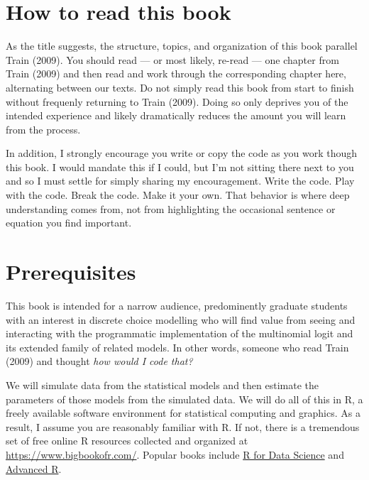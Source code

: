 \documentclass[
  letterpaper,
  DIV=11,
  numbers=noendperiod]{scrreprt}
\begin{document}
\section*{How to read this book}\label{how-to-read-this-book}


As the title suggests, the structure, topics, and organization of this
book parallel Train (2009). You should read --- or most likely, re-read
--- one chapter from Train (2009) and then read and work through the
corresponding chapter here, alternating between our texts. Do not simply
read this book from start to finish without frequenly returning to Train
(2009). Doing so only deprives you of the intended experience and likely
dramatically reduces the amount you will learn from the process.

In addition, I strongly encourage you write or copy the code as you work
though this book. I would mandate this if I could, but I'm not sitting
there next to you and so I must settle for simply sharing my
encouragement. Write the code. Play with the code. Break the code. Make
it your own. That behavior is where deep understanding comes from, not
from highlighting the occasional sentence or equation you find
important.

\section*{Prerequisites}\label{prerequisites}


This book is intended for a narrow audience, predominently graduate
students with an interest in discrete choice modelling who will find
value from seeing and interacting with the programmatic implementation
of the multinomial logit and its extended family of related models. In
other words, someone who read Train (2009) and thought \emph{how would I
code that?}

We will simulate data from the statistical models and then estimate the
parameters of those models from the simulated data. We will do all of
this in R, a freely available software environment for statistical
computing and graphics. As a result, I assume you are reasonably
familiar with R. If not, there is a tremendous set of free online R
resources collected and organized at \url{https://www.bigbookofr.com/}.
Popular books include \href{https://r4ds.hadley.nz/}{R for Data Science}
and \href{https://adv-r.hadley.nz/}{Advanced R}.
\end{document}
